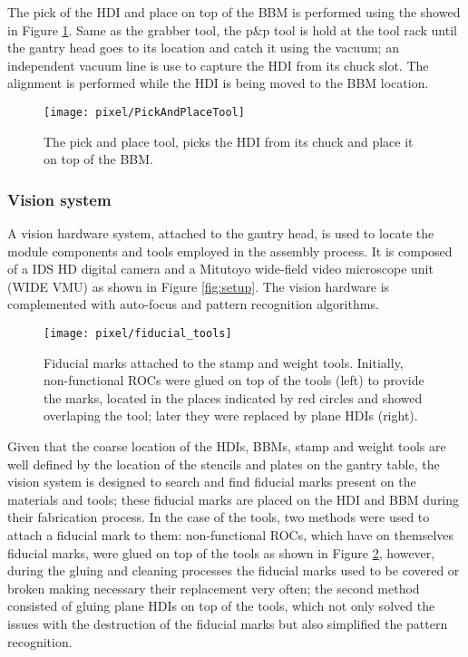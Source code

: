 The pick of the HDI and place on top of the BBM is performed using the  showed in Figure \ref{fig:pandp_tool}. Same as the grabber tool, the p\&p tool is hold at the tool rack until the gantry head goes to its location and catch it using the vacuum; an independent vacuum line is use to capture the HDI from its chuck slot. The alignment is performed while the HDI is being moved to the BBM location.      
\begin{figure}[!h]
  \centering  
  \texttt{[image: pixel/PickAndPlaceTool]}\\
  \caption[Pick and place tool.]{The pick and place tool, picks the HDI from its chuck and place it on top of the BBM.}\label{fig:pandp_tool}
\end{figure}

\subsubsection*{Vision system}

A vision hardware system, attached to the gantry head, is used to locate the module components and tools employed in the assembly process. It is composed of a IDS HD digital camera and a Mitutoyo wide-field video microscope unit (WIDE VMU) as shown in Figure \ref{fig:setup}. The vision hardware is complemented with auto-focus and pattern recognition algorithms. 

\begin{figure}[!h]
  \centering  
  \texttt{[image: pixel/fiducial\_tools]}\\
  \caption[Fiducial marks on tools.]{Fiducial marks attached to the stamp and weight tools. Initially, non-functional ROCs were glued on top of the tools (left) to provide the marks, located in the places indicated by red circles and showed overlaping the tool; later they were replaced by plane HDIs (right).}\label{fig:fiducial_tools}
\end{figure}

Given that the coarse location of the HDIs, BBMs, stamp and weight tools are well defined by the location of the stencils and plates on the gantry table, the vision system is designed to search and find fiducial marks present on the materials and tools; these fiducial marks are placed on the HDI and BBM during their fabrication process. In the case of the tools, two methods were used to attach a fiducial mark to them: non-functional ROCs, which have on themselves fiducial marks, were glued on top of the tools as shown in Figure \ref{fig:fiducial_tools}, however, during the gluing and cleaning processes the fiducial marks used to be covered or broken making necessary their replacement very often; the second method consisted of gluing plane HDIs on top of the tools, which not only solved the issues with the destruction of the fiducial marks but also simplified the pattern recognition.

